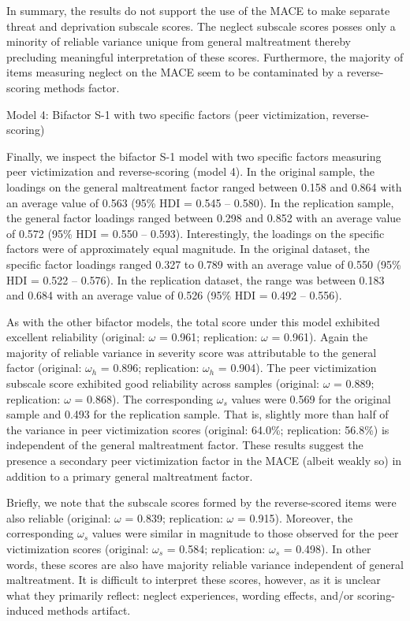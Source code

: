 \documentclass[letterpaper,man,natbib,floatsintext,longtable]{apa6}
\makeatletter
\renewcommand{\subsubsection}{\@startsection{subsubsection}{3}
  {\z@}%
  {\b@level@two@skip}{\e@level@two@skip}%
  {\normalfont\normalsize\bfseries}}
\makeatother
\begin{document}
In summary, the results do not support the use of the MACE to make separate threat and deprivation subscale scores. The neglect subscale scores posses only a minority of reliable variance unique from general maltreatment thereby precluding meaningful interpretation of these scores. Furthermore, the majority of items measuring neglect on the MACE seem to be contaminated by a reverse-scoring methods factor.

\subsubsection{Model 4: Bifactor S-1 with two specific factors (peer victimization, reverse-scoring)}

Finally, we inspect the bifactor S-1 model with two specific factors measuring peer victimization and reverse-scoring (model 4). In the original sample, the loadings on the general maltreatment factor ranged between 0.158 and 0.864 with an average value of 0.563 (95\% HDI = 0.545 -- 0.580). In the replication sample, the general factor loadings ranged between 0.298 and 0.852 with an average value of 0.572 (95\% HDI = 0.550 -- 0.593). Interestingly, the loadings on the specific factors were of approximately equal magnitude. In the original dataset, the specific factor loadings ranged 0.327 to 0.789 with an average value of 0.550 (95\% HDI = 0.522 -- 0.576). In the replication dataset, the range was between 0.183 and 0.684 with an average value of 0.526 (95\% HDI = 0.492 -- 0.556). 

As with the other bifactor models, the total score under this model exhibited excellent reliability (original: $\omega$ = 0.961; replication: $\omega$ = 0.961). Again the majority of reliable variance in severity score was attributable to the general factor (original: $\omega_h$ = 0.896; replication: $\omega_h$ = 0.904). The peer victimization subscale score exhibited good reliability across samples (original: $\omega$ = 0.889; replication: $\omega$ = 0.868). The corresponding $\omega_s$ values were 0.569 for the original sample and 0.493 for the replication sample. That is, slightly more than half of the variance in peer victimization scores (original: 64.0\%; replication: 56.8\%) is independent of the general maltreatment factor. These results suggest the presence a secondary peer victimization factor in the MACE (albeit weakly so) in addition to a primary general maltreatment factor. 

Briefly, we note that the subscale scores formed by the reverse-scored items were also reliable (original: $\omega$ = 0.839; replication: $\omega$ = 0.915). Moreover, the corresponding $\omega_s$ values were similar in magnitude to those observed for the peer victimization scores (original: $\omega_s$ = 0.584; replication: $\omega_s$ = 0.498). In other words, these scores are also have majority reliable variance independent of general maltreatment. It is difficult to interpret these scores, however, as it is unclear what they primarily reflect: neglect experiences, wording effects, and/or scoring-induced methods artifact. 
\end{document}
